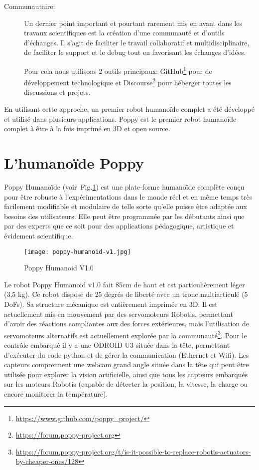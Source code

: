 \begin{description}
  \item[Communautaire:] Un dernier point important et pourtant rarement mis en avant dans les travaux scientifiques est la création d'une communauté et d'outils d'échanges. Il s'agit de faciliter le travail collaboratif et multidisciplinaire, de faciliter le support et le debug tout en favorisant les échanges d'idées. 

  Pour cela nous utilisons 2 outils principaux: GitHub\footnote{\url{https://www.github.com/poppy_project/}} pour de développement technologique et Discourse\footnote{\url{https://forum.poppy-project.org}} pour héberger toutes les discussions et projets.

\end{description}

En utilisant cette approche, un premier robot humanoïde complet a été développé et utilisé dans plusieurs applications. Poppy est le premier robot humanoïde complet à être à la fois imprimé en 3D et open source. 


\section*{L'humanoïde Poppy} %

Poppy Humanoïde (voir~Fig.\ref{fig:poppy_humanoid_v1}) est une plate-forme humanoïde complète conçu pour être robuste à l'expérimentations dans le monde réel et en même temps très facilement modifiable et modulaire de telle sorte qu'elle puisse être adaptée aux besoins des utilisateurs. Elle peut être programmée par les débutants ainsi que par des experts que ce soit pour des applications pédagogique, artistique et évidement scientifique.

  \begin{figure}[h]
      \begin{center}
          \texttt{[image: poppy-humanoid-v1.jpg]}
      \end{center}
      \caption{Poppy Humanoid V1.0}
      \label{fig:poppy_humanoid_v1}
  \end{figure}

Le robot Poppy Humanoid v1.0 fait 85cm de haut et est particulièrement léger (3,5 kg). Ce robot dispose de 25 degrés de liberté avec un tronc multiarticulé (5 DoFs). Sa structure mécanique est entièrement imprimée en 3D. Il est actuellement mis en mouvement par des servomoteurs Robotis, permettant d'avoir des réactions compliantes aux des forces extérieures, mais l'utilisation de servomoteurs alternatifs est actuellement explorée par la communauté\footnote{\url{https://forum.poppy-project.org/t/is-it-possible-to-replace-robotis-actuators-by-cheaper-ones/128}}.
Pour le contrôle embarqué il y a une ODROID U3 située dans la tête, permettant d'exécuter du code python et de gérer la communication (Ethernet et Wifi).
Les capteurs comprennent une webcam grand angle située dans la tête qui peut être utilisée pour explorer la vision artificielle, ainsi que tous les capteurs embarqués sur les moteurs Robotis (capable de détecter la position, la vitesse, la charge ou encore monitorer la température).

